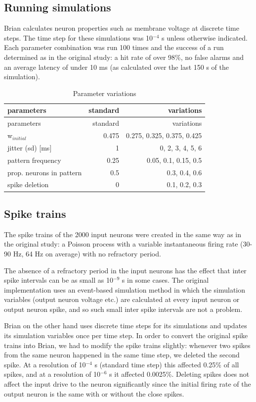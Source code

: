 \documentclass[10pt,a4paper,onecolumn]{article}
\begin{document}
\subsection{Running simulations}\label{running-simulations}

Brian calculates neuron properties such as membrane voltage at discrete
time steps. The time step for these simulations was 10\(^{-4}\) s unless
otherwise indicated. Each parameter combination was run 100 times and
the success of a run determined as in the original study: a hit rate of
over 98\%, no false alarms and an average latency of under 10 ms (as
calculated over the last 150 s of the simulation).

\hypertarget{tbl:param}{}
\begin{longtable}[]{@{}lrr@{}}
\caption{\label{tbl:param}Parameter variations }\tabularnewline
\toprule
parameters & standard & variations\tabularnewline
\midrule
\endfirsthead
\toprule
parameters & standard & variations\tabularnewline
\midrule
\endhead
w\(_{initial}\) & 0.475 & 0.275, 0.325, 0.375, 0.425\tabularnewline
jitter (sd) {[}ms{]} & 1 & 0, 2, 3, 4, 5, 6\tabularnewline
pattern frequency & 0.25 & 0.05, 0.1, 0.15, 0.5\tabularnewline
prop. neurons in pattern & 0.5 & 0.3, 0.4, 0.6\tabularnewline
spike deletion & 0 & 0.1, 0.2, 0.3\tabularnewline
\bottomrule
\end{longtable}

\subsection{Spike trains}\label{spike-trains}

The spike trains of the 2000 input neurons were created in the same way
as in the original study: a Poisson process with a variable
instantaneous firing rate (30-90 Hz, 64 Hz on average) with no
refractory period.

The absence of a refractory period in the input neurons has the effect
that inter spike intervals can be as small as 10\(^{-9}\) s in some
cases. The original implementation uses an event-based simulation method
in which the simulation variables (output neuron voltage etc.) are
calculated at every input neuron or output neuron spike, and so such
small inter spike intervals are not a problem.

Brian on the other hand uses discrete time steps for its simulations and
updates its simulation variables once per time step. In order to convert
the original spike trains into Brian, we had to modify the spike trains
slightly: whenever two spikes from the same neuron happened in the same
time step, we deleted the second spike. At a resolution of 10\(^{-4}\) s
(standard time step) this affected 0.25\% of all spikes, and at a
resolution of 10\(^{-6}\) s it affected 0.0025\%. Deleting spikes does
not affect the input drive to the neuron significantly since the initial
firing rate of the output neuron is the same with or without the close
spikes.
\end{document}
